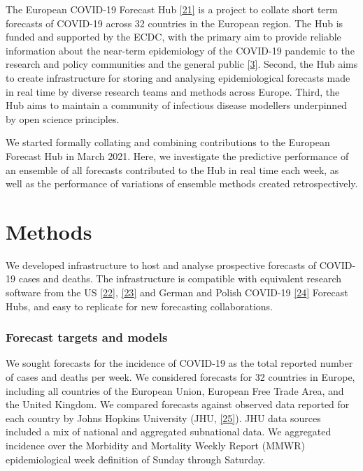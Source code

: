 \documentclass[
]{article}
\begin{document}
The European COVID-19 Forecast Hub \protect\hyperlink{ref-europeancovid-19forecasthubEuropeanCOVID19Forecast2021}{{[}21{]}} is a project to collate short term forecasts of COVID-19 across 32 countries in the European region. The Hub is funded and supported by the ECDC, with the primary aim to provide reliable information about the near-term epidemiology of the COVID-19 pandemic to the research and policy communities and the general public \protect\hyperlink{ref-europeancentrefordiseasepreventionandcontrolForecastingCOVID19Cases2021}{{[}3{]}}. Second, the Hub aims to create infrastructure for storing and analysing epidemiological forecasts made in real time by diverse research teams and methods across Europe. Third, the Hub aims to maintain a community of infectious disease modellers underpinned by open science principles.

We started formally collating and combining contributions to the European Forecast Hub in March 2021. Here, we investigate the predictive performance of an ensemble of all forecasts contributed to the Hub in real time each week, as well as the performance of variations of ensemble methods created retrospectively.

\hypertarget{methods}{%
\section{Methods}\label{methods}}

We developed infrastructure to host and analyse prospective forecasts of COVID-19 cases and deaths. The infrastructure is compatible with equivalent research software from the US \protect\hyperlink{ref-cramerReichlabCovid19forecasthubRelease2021}{{[}22{]}}, \protect\hyperlink{ref-wangReichlabCovidHubUtilsRepository2021}{{[}23{]}} and German and Polish COVID-19 \protect\hyperlink{ref-bracherGermanPolishCOVID192020}{{[}24{]}} Forecast Hubs, and easy to replicate for new forecasting collaborations.

\hypertarget{forecast-targets-and-models}{%
\subsubsection{Forecast targets and models}\label{forecast-targets-and-models}}

We sought forecasts for the incidence of COVID-19 as the total reported number of cases and deaths per week. We considered forecasts for 32 countries in Europe, including all countries of the European Union, European Free Trade Area, and the United Kingdom. We compared forecasts against observed data reported for each country by Johns Hopkins University (JHU, \protect\hyperlink{ref-dongInteractiveWebbasedDashboard2020}{{[}25{]}}). JHU data sources included a mix of national and aggregated subnational data. We aggregated incidence over the Morbidity and Mortality Weekly Report (MMWR) epidemiological week definition of Sunday through Saturday.
\end{document}
